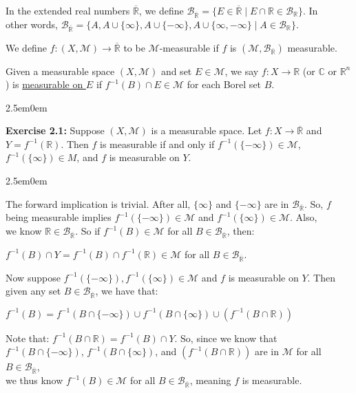 \documentclass{book}
\newcommand{\exOne}{%
   \color{Purple}%
   \fontsize{13}{15}\selectfont%
}
\newcommand{\exTwoP}{%
   \color{RedViolet}%
   \fontsize{13}{15}\selectfont%
}
\newenvironment{myIndent}{%
   \begin{adjustwidth}{2.5em}{0em}%
}{%
   \end{adjustwidth}%
}
\newcommand{\udefine}[1]{{%
   \setulcolor{Red}%
   \setul{0.14em}{0.07em}%
   \ul{#1}%
}}
\newcommand{\blab}[1]{\textbf{#1}}
\newcommand{\retTwo}{\hfill\bigbreak}
\begin{document}
In the extended real numbers $\overline{\mathbb{R}}$, we define $\mathcal{B}_{\overline{\mathbb{R}}} = \{E \in \overline{\mathbb{R}} \mid E \cap \mathbb{R} \in \mathcal{B}_{\mathbb{R}}\}$. In\\ other words, $\mathcal{B}_{\overline{\mathbb{R}}} = \{A, A \cup\{\infty\}, A \cup\{-\infty\}, A \cup\{\infty, -\infty\} \mid A \in \mathcal{B}_{\mathbb{R}} \}$.\retTwo

We define $f: (X, \mathcal{M}) \longrightarrow \overline{\mathbb{R}}$ to be $\mathcal{M}$-measurable if $f$ is $(\mathcal{M}, \mathcal{B}_{\overline{\mathbb{R}}})$ measurable.\retTwo

Given a measurable space $(X, \mathcal{M})$ and set $E \in \mathcal{M}$, we say $f: X \longrightarrow \mathbb{R}$ (or $\mathbb{C}$ or $\mathbb{R}^n$) is \udefine{measurable on $E$} if $f^{-1}(B) \cap E \in \mathcal{M}$ for each Borel set $B$.\retTwo

\begin{myIndent}\exOne
   \blab{Exercise 2.1:} Suppose $(X, \mathcal{M})$ is a measurable space. Let $f: X \longrightarrow \overline{\mathbb{R}}$ and\\ $Y = f^{-1}(\mathbb{R})$. Then $f$ is measurable if and only if $f^{-1}(\{-\infty\}) \in \mathcal{M}$,\\ $f^{-1}(\{\infty\}) \in M$, and $f$ is measurable on $Y$.\retTwo

   \begin{myIndent}\exTwoP
      The forward implication is trivial. After all, $\{\infty\}$ and $\{-\infty\}$ are in $\mathcal{B}_{\overline{\mathbb{R}}}$. So, $f$ being measurable implies $f^{-1}(\{-\infty\}) \in \mathcal{M}$ and $f^{-1}(\{\infty\}) \in \mathcal{M}$. Also,\\ we know $\mathbb{R} \in \mathcal{B}_{\overline{\mathbb{R}}}$. So if $f^{-1}(B) \in \mathcal{M}$ for all $B \in \mathcal{B}_{\overline{\mathbb{R}}}$, then: 
      
      {\center $f^{-1}(B) \cap Y = f^{-1}(B) \cap f^{-1}(\mathbb{R}) \in \mathcal{M}$ for all $B \in \mathcal{B}_{\overline{\mathbb{R}}}$.\retTwo\par}

      Now suppose $f^{-1}(\{-\infty\}), f^{-1}(\{\infty\}) \in \mathcal{M}$ and $f$ is measurable on $Y$. Then given any set $B \in \mathcal{B}_{\overline{\mathbb{R}}}$, we have that:

      {\center $f^{-1}(B) = f^{-1}(B \cap \{-\infty\}) \cup f^{-1}(B \cap \{\infty\}) \cup (f^{-1}(B \cap \mathbb{R}))$ \retTwo\par}

      Note that: $f^{-1}(B \cap \mathbb{R}) = f^{-1}(B) \cap Y$. So, since we know that\\ $f^{-1}(B \cap \{-\infty\})$, $f^{-1}(B \cap \{\infty\})$, and $(f^{-1}(B \cap \mathbb{R}))$ are in $\mathcal{M}$ for all $B \in \mathcal{B}_{\overline{\mathbb{R}}}$,\\ we thus know $f^{-1}(B) \in \mathcal{M}$ for all $B \in \mathcal{B}_{\overline{\mathbb{R}}}$, meaning $f$ is measurable.\newpage
   \end{myIndent}
\end{myIndent}
\end{document}
